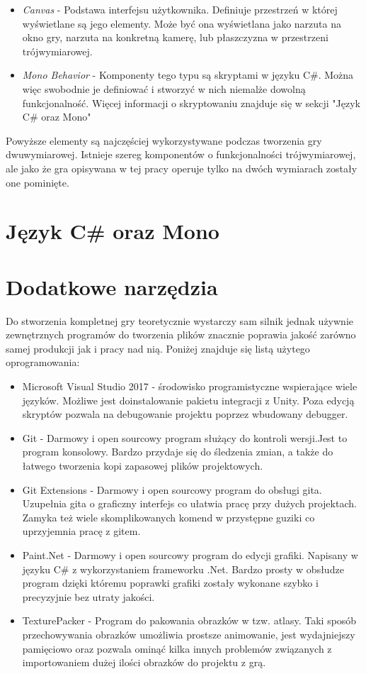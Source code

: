 \documentclass[a4paper,12pt,twoside,openany]{report}
\begin{document}
\begin{itemize}
    \item \textit{Canvas} - Podstawa interfejsu użytkownika. Definiuje przestrzeń w której wyświetlane są jego elementy. Może być ona wyświetlana jako narzuta na okno gry, narzuta na konkretną kamerę, lub płaszczyzna w przestrzeni trójwymiarowej.
    \item \textit{Mono Behavior} - Komponenty tego typu są skryptami w języku C\#. Można więc swobodnie je definiować i stworzyć w nich niemalże dowolną funkcjonalność. Więcej informacji o skryptowaniu znajduje się w sekcji "Język C\# oraz Mono"
\end{itemize}
Powyższe elementy są najczęściej wykorzystywane podczas tworzenia gry dwuwymiarowej. Istnieje szereg komponentów o funkcjonalności trójwymiarowej, ale jako że gra opisywana w tej pracy operuje tylko na dwóch wymiarach zostały one pominięte.

\section{Język C\# oraz Mono}

\section{Dodatkowe narzędzia}
Do stworzenia kompletnej gry teoretycznie wystarczy sam silnik jednak używnie zewnętrznych programów do tworzenia plików znacznie poprawia jakość zarówno samej produkcji jak i pracy nad nią. Poniżej znajduje się listą użytego oprogramowania:

\begin{itemize}
    \item Microsoft Visual Studio 2017 - środowisko programistyczne wspierające wiele języków. Możliwe jest doinstalowanie pakietu integracji z Unity. Poza edycją skryptów pozwala na debugowanie projektu poprzez wbudowany debugger.
    \item Git - Darmowy i open sourcowy program służący do kontroli wersji.Jest to program konsolowy. Bardzo przydaje się do śledzenia zmian, a także do łatwego tworzenia kopi zapasowej plików projektowych.
    \item Git Extensions - Darmowy i open sourcowy program do obsługi gita. Uzupełnia gita o graficzny interfejs co ułatwia pracę przy dużych projektach. Zamyka też wiele skomplikowanych komend w przystępne guziki co uprzyjemnia pracę z gitem.
    \item Paint.Net - Darmowy i open sourcowy program do edycji grafiki. Napisany w języku C\# z wykorzystaniem frameworku .Net. Bardzo prosty w obsłudze program dzięki któremu poprawki grafiki zostały wykonane szybko i precyzyjnie bez utraty jakości.
    \item TexturePacker - Program do pakowania obrazków w tzw. atlasy. Taki sposób przechowywania obrazków umożliwia prostsze animowanie, jest wydajniejszy pamięciowo oraz pozwala ominąć kilka innych problemów związanych z importowaniem dużej ilości obrazków do projektu z grą.
\end{itemize}
\end{document}
